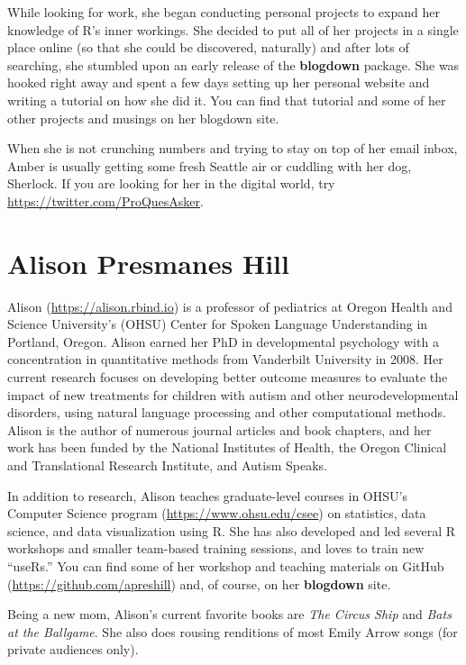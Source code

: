 \documentclass[
  12pt,
]{krantz}
\begin{document}
While looking for work, she began conducting personal projects to expand her knowledge of R's inner workings. She decided to put all of her projects in a single place online (so that she could be discovered, naturally) and after lots of searching, she stumbled upon an early release of the \textbf{blogdown} package. She was hooked right away and spent a few days setting up her personal website and writing a tutorial on how she did it. You can find that tutorial and some of her other projects and musings on her blogdown site.

When she is not crunching numbers and trying to stay on top of her email inbox, Amber is usually getting some fresh Seattle air or cuddling with her dog, Sherlock. If you are looking for her in the digital world, try \url{https://twitter.com/ProQuesAsker}.

\hypertarget{alison-presmanes-hill}{%
\section*{Alison Presmanes Hill}\label{alison-presmanes-hill}}


Alison (\url{https://alison.rbind.io}) is a professor of pediatrics at Oregon Health and Science University's (OHSU) Center for Spoken Language Understanding in Portland, Oregon. Alison earned her PhD in developmental psychology with a concentration in quantitative methods from Vanderbilt University in 2008. Her current research focuses on developing better outcome measures to evaluate the impact of new treatments for children with autism and other neurodevelopmental disorders, using natural language processing and other computational methods. Alison is the author of numerous journal articles and book chapters, and her work has been funded by the National Institutes of Health, the Oregon Clinical and Translational Research Institute, and Autism Speaks.

In addition to research, Alison teaches graduate-level courses in OHSU's Computer Science program (\url{https://www.ohsu.edu/csee}) on statistics, data science, and data visualization using R. She has also developed and led several R workshops and smaller team-based training sessions, and loves to train new ``useRs.'' You can find some of her workshop and teaching materials on GitHub (\url{https://github.com/apreshill}) and, of course, on her \textbf{blogdown} site.

Being a new mom, Alison's current favorite books are \emph{The Circus Ship} and \emph{Bats at the Ballgame}. She also does rousing renditions of most Emily Arrow songs (for private audiences only).
\end{document}
